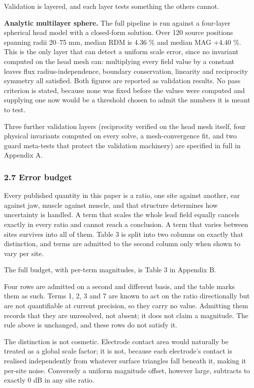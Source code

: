 \documentclass[manuscript,review,anonymous]{acmart}
\newcounter{none}
\begin{document}
Validation is layered, and each layer tests something the others cannot.

\textbf{Analytic multilayer sphere.} The full pipeline is run against a four-layer
spherical head model with a closed-form solution. Over 120 source positions
spanning radii 20--75 mm, median RDM is 4.36 \% and median MAG +4.40 \%. This is
the only layer that can detect a uniform scale error, since no invariant
computed on the head mesh can: multiplying every field value by a constant
leaves flux radius-independence, boundary conservation, linearity and
reciprocity symmetry all satisfied. Both figures are reported as validation
results. No pass criterion is stated, because none was fixed before the values
were computed and supplying one now would be a threshold chosen to admit the
numbers it is meant to test.

Three further validation layers (reciprocity verified on the head mesh itself, four physical invariants computed on every solve, a mesh-convergence fit, and two guard meta-tests that protect the validation machinery) are specified in full in Appendix A.

\subsubsection{2.7 Error budget}\label{error-budget}

Every published quantity in this paper is a ratio, one site against another,
ear against jaw, muscle against muscle, and that structure determines how
uncertainty is handled. A term that scales the whole lead field equally cancels
exactly in every ratio and cannot reach a conclusion. A term that varies between
sites survives into all of them. Table 3 is split into two columns on exactly
that distinction, and terms are admitted to the second column only when shown to
vary per site.

The full budget, with per-term magnitudes, is Table 3 in Appendix B.

Four rows are admitted on a second and different basis, and the table marks them
as such. Terms 1, 2, 3 and 7 are known to act on the ratio directionally but are
not quantifiable at current precision, so they carry no value. Admitting them
records that they are unresolved, not absent; it does not claim a
magnitude. The rule above is unchanged, and these rows do not satisfy it.

The distinction is not cosmetic. Electrode contact area would naturally be
treated as a global scale factor; it is not, because each electrode's contact is
realised independently from whatever surface triangles fall beneath it, making
it per-site noise. Conversely a uniform magnitude offset, however large,
subtracts to exactly 0 dB in any site ratio.
\end{document}
